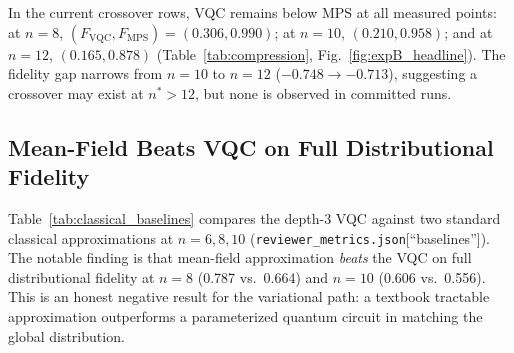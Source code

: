 \documentclass[conference,10pt]{IEEEtran}
\begin{document}
In the current crossover rows, VQC remains below MPS at all measured points: at $n=8$, $(F_{\mathrm{VQC}},F_{\mathrm{MPS}})=(0.306,0.990)$; at $n=10$, $(0.210,0.958)$; and at $n=12$, $(0.165,0.878)$ (Table~\ref{tab:compression}, Fig.~\ref{fig:expB_headline}). The fidelity gap narrows from $n=10$ to $n=12$ ($-0.748\rightarrow-0.713$), suggesting a crossover may exist at $n^*>12$, but none is observed in committed runs.

\subsection{Mean-Field Beats VQC on Full Distributional Fidelity}
\label{sec:classical_baselines}

Table~\ref{tab:classical_baselines} compares the depth-3 VQC against two standard classical approximations at $n=6,8,10$ (\texttt{reviewer\_metrics.json}[``baselines'']). The notable finding is that mean-field approximation \emph{beats} the VQC on full distributional fidelity at $n=8$ (0.787 vs.\ 0.664) and $n=10$ (0.606 vs.\ 0.556). This is an honest negative result for the variational path: a textbook tractable approximation outperforms a parameterized quantum circuit in matching the global distribution.
\end{document}
